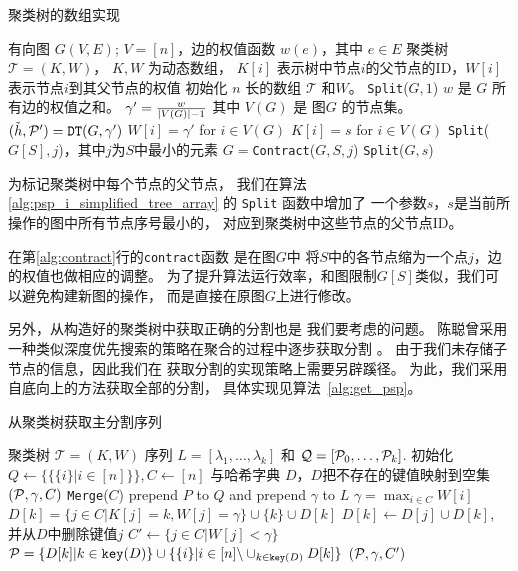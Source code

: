 \begin{algorithm}[!ht]
	\caption{聚类树的数组实现}\label{alg:psp_i_simplified_tree_array}
	\begin{algorithmic}[1]
		\REQUIRE 有向图 $G(V, E)$; $V=[n]$，边的权值函数 $w(e)$，其中 $e\in E$
		\ENSURE 聚类树 $\mathcal{T}=(K, W)$， $K,W$ 为动态数组，
    $K[i]$ 表示树中节点$i$的父节点的ID，$W[i]$表示节点$i$到其父节点的权值
		\STATE 初始化 $n$ 长的数组 $\mathcal{T}$
     和$W$。
		\STATE \texttt{Split}($G, 1$)
		\STATE $w$ 是 $G$ 所有边的权值之和。
		\STATE $\gamma' = \frac{w}{\abs{V(G)}-1}$
    其中 $V(G)$ 是 图$G$
    的节点集。
		\STATE $(\tilde{h}, \P')
    = \texttt{DT}(G, \gamma')$ 
		\STATE $W[i]=\gamma'$ for $ i \in V(G)$
    \STATE $K[i]=s$ for $i\in V(G)$
    \ELSE
		\STATE \texttt{Split}($G[S], j$)，其中$j$为$S$中最小的元素
		\STATE $G=$\texttt{Contract}($G, S, j$) \label{alg:contract}
    \ENDFOR 
		\STATE \texttt{Split}($G, s$)
		\ENDIF
		\ENDFUNCTION
	\end{algorithmic}
\end{algorithm}

为标记聚类树中每个节点的父节点，
我们在算法\ref{alg:psp_i_simplified_tree_array}
的 \texttt{Split} 函数中增加了
一个参数$s$，$s$是当前所操作的图中所有节点序号最小的，
对应到聚类树中这些节点的父节点ID。

在第\ref{alg:contract}行的\texttt{contract}函数 是在图$G$中
将$S$中的各节点缩为一个点$j$，边的权值也做相应的调整。
为了提升算法运行效率，和图限制$G[S]$类似，我们可以避免构建新图的操作，
而是直接在原图$G$上进行修改。

另外，从构造好的聚类树中获取正确的分割也是
我们要考虑的问题。
陈聪曾采用一种类似深度优先搜索的策略在聚合的过程中逐步获取分割
\cite{chan2020agglomerative}。
由于我们未存储子节点的信息，因此我们在
获取分割的实现策略上需要另辟蹊径。
为此，我们采用自底向上的方法获取全部的分割，
具体实现见算法~\ref{alg:get_psp}。

\begin{algorithm}[!ht]
	\caption{从聚类树获取主分割序列}\label{alg:get_psp}
	\begin{algorithmic}[1]
		\REQUIRE 聚类树 $\mathcal{T}=(K, W)$
		\ENSURE 序列 $L=[\lambda_1, \dots, \lambda_k]$
    和 $\mathcal{Q}=[\P_0, \dots, \P_k]$.
    \STATE 初始化 $Q\leftarrow \{ \{\{i\}|i\in [n]\} \}, C\leftarrow [n]$ 与哈希字典 $D$，$D$把不存在的键值映射到空集
		\STATE $(\P,\gamma, C)$ \leftarrow \texttt{Merge}($C$)
    \STATE prepend $P$ to $Q$ and prepend $\gamma$ to $L$
    \ENDWHILE
    \STATE $\gamma = \max_{i\in C} W[i]$
    \STATE $D[k] = \{ j\in C | K[j] = k, W[j]=\gamma\} \cup \{k\} \cup D[k]$
    \STATE $D[k] \leftarrow D[j] \cup D[k]$, 并从$D$中删除键值$j$ 
    \ENDFOR
    \STATE $C' \leftarrow  \{j\in C | W[j]<\gamma\}$
    \STATE $\P=\{D[k] | k \in \texttt{key}(D)\} \cup \{\{i\} | i \in [n]\backslash \cup_{k \in \texttt{key}(D)} D[k] \}$
    \RETURN $(\P, \gamma, C')$
		\ENDFUNCTION
	\end{algorithmic}
\end{algorithm}


